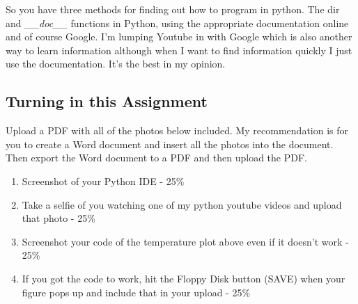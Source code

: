 So you have three methods for finding out how to program in
python. The dir and {\it \_\_doc\_\_} functions in Python, using the appropriate
documentation online and of course Google. I’m lumping Youtube in with
Google which is also another way to learn information although when I
want to find information quickly I just use the documentation. It’s
the best in my opinion. 

\subsection{Turning in this Assignment}

Upload a PDF with all of the photos below included. My recommendation
is for you to create a Word document and insert all the photos into
the document. Then export the Word document to a PDF and then upload
the PDF. 

\begin{enumerate}[itemsep=-5pt]
  \item Screenshot of your Python IDE - 25\%
  \item Take a selfie of you watching one of my python youtube videos and upload that photo - 25\%
  \item Screenshot your code of the temperature plot above even if it doesn’t work - 25\%
  \item If you got the code to work, hit the Floppy Disk button (SAVE)
    when your figure pops up and include that in your upload - 25\%
\end{enumerate}

